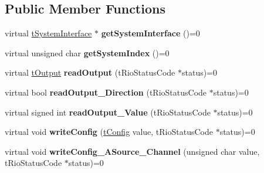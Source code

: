 \subsection*{Public Member Functions}
\begin{DoxyCompactItemize}
\item 
\hypertarget{classnFPGA_1_1nFRC__2012__1__6__4_1_1tEncoder_a9fff1f12a74329c7e7bf2a7acacb2f79}{
virtual \hyperlink{classnFPGA_1_1tSystemInterface}{tSystemInterface} $\ast$ {\bfseries getSystemInterface} ()=0}
\label{classnFPGA_1_1nFRC__2012__1__6__4_1_1tEncoder_a9fff1f12a74329c7e7bf2a7acacb2f79}

\item 
\hypertarget{classnFPGA_1_1nFRC__2012__1__6__4_1_1tEncoder_a530ee0c17e283796e573a24862e05292}{
virtual unsigned char {\bfseries getSystemIndex} ()=0}
\label{classnFPGA_1_1nFRC__2012__1__6__4_1_1tEncoder_a530ee0c17e283796e573a24862e05292}

\item 
\hypertarget{classnFPGA_1_1nFRC__2012__1__6__4_1_1tEncoder_ad726298f4ed3161c0c657296289b8432}{
virtual \hyperlink{unionnFPGA_1_1nFRC__2012__1__6__4_1_1tEncoder_1_1tOutput}{tOutput} {\bfseries readOutput} (tRioStatusCode $\ast$status)=0}
\label{classnFPGA_1_1nFRC__2012__1__6__4_1_1tEncoder_ad726298f4ed3161c0c657296289b8432}

\item 
\hypertarget{classnFPGA_1_1nFRC__2012__1__6__4_1_1tEncoder_a8705ebbf0b026154591aa9bd48729d9f}{
virtual bool {\bfseries readOutput\_\-Direction} (tRioStatusCode $\ast$status)=0}
\label{classnFPGA_1_1nFRC__2012__1__6__4_1_1tEncoder_a8705ebbf0b026154591aa9bd48729d9f}

\item 
\hypertarget{classnFPGA_1_1nFRC__2012__1__6__4_1_1tEncoder_a8751d7c950e1b56ce55f53e1fec8fb00}{
virtual signed int {\bfseries readOutput\_\-Value} (tRioStatusCode $\ast$status)=0}
\label{classnFPGA_1_1nFRC__2012__1__6__4_1_1tEncoder_a8751d7c950e1b56ce55f53e1fec8fb00}

\item 
\hypertarget{classnFPGA_1_1nFRC__2012__1__6__4_1_1tEncoder_a9cf83e7263e39fcf34b2e7f9e24c0c91}{
virtual void {\bfseries writeConfig} (\hyperlink{unionnFPGA_1_1nFRC__2012__1__6__4_1_1tEncoder_1_1tConfig}{tConfig} value, tRioStatusCode $\ast$status)=0}
\label{classnFPGA_1_1nFRC__2012__1__6__4_1_1tEncoder_a9cf83e7263e39fcf34b2e7f9e24c0c91}

\item 
\hypertarget{classnFPGA_1_1nFRC__2012__1__6__4_1_1tEncoder_a8077fffa1522b40840febea770cca973}{
virtual void {\bfseries writeConfig\_\-ASource\_\-Channel} (unsigned char value, tRioStatusCode $\ast$status)=0}
\label{classnFPGA_1_1nFRC__2012__1__6__4_1_1tEncoder_a8077fffa1522b40840febea770cca973}


\end{DoxyCompactItemize}
